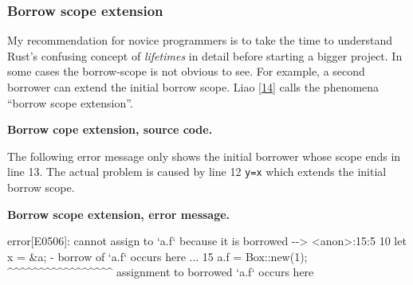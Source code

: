 \subsubsection{Borrow scope extension}\label{_borrow_scope_extension}

My recommendation for novice programmers is to take the time to
understand Rust's confusing concept of \emph{lifetimes} in detail before
starting a bigger project. In some cases the borrow-scope is not obvious
to see. For example, a second borrower can extend the initial borrow
scope. Liao {[}\protect\hyperlink{liao2014}{14}{]} calls the phenomena
``borrow scope extension''.

\textbf{Borrow cope extension, source code.}

\begin{Shaded}
\begin{Highlighting}[]
 
    \NormalTok{<}\NormalTok{>,}
\NormalTok{\}}

 
      \NormalTok{) \};}
     
      \NormalTok{\{}
         
    \NormalTok{\}}
    \NormalTok{);}
\NormalTok{\}}
\end{Highlighting}
\end{Shaded}

The following error message only shows the initial borrower whose scope
ends in line 13. The actual problem is caused by line 12 \texttt{y=x}
which extends the initial borrow scope.

\textbf{Borrow scope extension, error message.}

error{[}E0506{]}: cannot assign to `a.f` because it is borrowed
-\/-\textgreater{} \textless{}anon\textgreater{}:15:5 \textbar{} 10
\textbar{} let x = \&a; \textbar{} - borrow of `a.f` occurs here ... 15
\textbar{} a.f = Box::new(1); \textbar{}
\^{}\^{}\^{}\^{}\^{}\^{}\^{}\^{}\^{}\^{}\^{}\^{}\^{}\^{}\^{}\^{}\^{}
assignment to borrowed `a.f` occurs here

